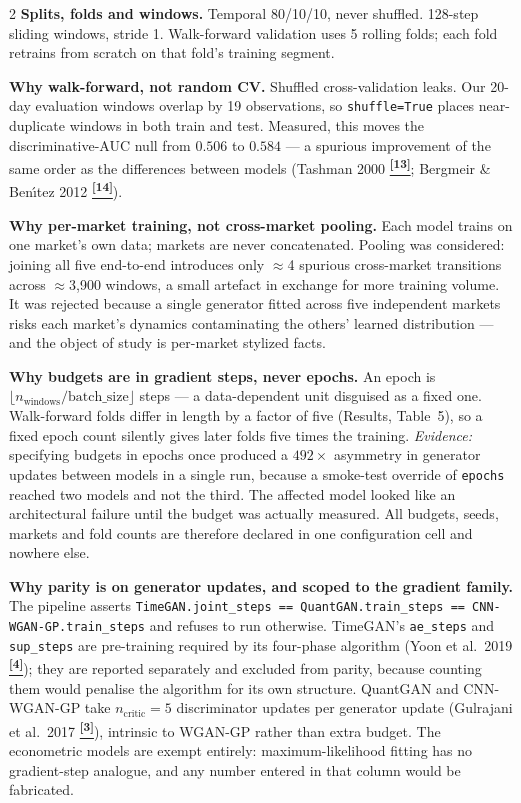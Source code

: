 \documentclass[10pt]{article}
\newcommand{\tcite}[1]{%
  \hyperlink{R:#1}{\textsuperscript{\scriptsize\textbf{[#1]}}}}
\begin{document}
\begin{multicols}{2}
\smallskip
\textbf{Splits, folds and windows.}
Temporal 80/10/10, never shuffled. 128-step sliding windows, stride 1. Walk-forward validation uses 5 rolling folds; each fold retrains from scratch on that fold's training segment.

\smallskip
\textbf{Why walk-forward, not random CV.}
Shuffled cross-validation leaks. Our 20-day evaluation windows overlap by 19 observations, so \texttt{shuffle=True} places near-duplicate windows in both train and test. Measured, this moves the discriminative-AUC null from $0.506$ to $0.584$ --- a spurious improvement of the same order as the differences between models (Tashman 2000\tcite{13}; Bergmeir \& Ben\'{\i}tez 2012\tcite{14}).

\smallskip
\textbf{Why per-market training, not cross-market pooling.}
Each model trains on one market's own data; markets are never concatenated. Pooling was considered: joining all five end-to-end introduces only $\approx$4 spurious cross-market transitions across $\approx$3{,}900 windows, a small artefact in exchange for more training volume. It was rejected because a single generator fitted across five independent markets risks each market's dynamics contaminating the others' learned distribution --- and the object of study is per-market stylized facts.

\columnbreak

\textbf{Why budgets are in gradient steps, never epochs.}
An epoch is $\lfloor n_\text{windows}/\text{batch\_size}\rfloor$ steps --- a data-dependent unit disguised as a fixed one. Walk-forward folds differ in length by a factor of five (Results, Table~5), so a fixed epoch count silently gives later folds five times the training. \textit{Evidence:} specifying budgets in epochs once produced a $492\times$ asymmetry in generator updates between models in a single run, because a smoke-test override of \texttt{epochs} reached two models and not the third. The affected model looked like an architectural failure until the budget was actually measured. All budgets, seeds, markets and fold counts are therefore declared in one configuration cell and nowhere else.

\smallskip
\textbf{Why parity is on generator updates, and scoped to the gradient family.}
The pipeline asserts \texttt{TimeGAN.joint\_steps == QuantGAN.train\_steps == CNN-WGAN-GP.train\_steps} and refuses to run otherwise. TimeGAN's \texttt{ae\_steps} and \texttt{sup\_steps} are pre-training required by its four-phase algorithm (Yoon et al.\ 2019\tcite{4}); they are reported separately and excluded from parity, because counting them would penalise the algorithm for its own structure. QuantGAN and CNN-WGAN-GP take $n_\text{critic}=5$ discriminator updates per generator update (Gulrajani et al.\ 2017\tcite{3}), intrinsic to WGAN-GP rather than extra budget. The econometric models are exempt entirely: maximum-likelihood fitting has no gradient-step analogue, and any number entered in that column would be fabricated.


\end{multicols}
\end{document}
